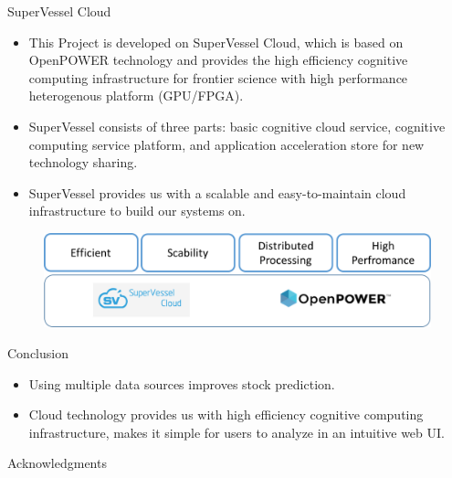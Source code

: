 \documentclass[final,hyperref={pdfpagelabels=false}]{beamer}
\begin{document}
\begin{frame}[t]
\begin{columns}[t]
\begin{column}{.445\textwidth}
\begin{block}{SuperVessel Cloud}
\begin{itemize}
\item This Project is developed on SuperVessel Cloud, which  is based on OpenPOWER technology and provides the high efficiency cognitive computing infrastructure for frontier science with high performance heterogenous platform (GPU/FPGA).
\item SuperVessel consists of three parts: basic cognitive cloud service, cognitive computing service platform, and application acceleration store for new technology sharing. 
\item SuperVessel provides us with a scalable and easy-to-maintain cloud infrastructure to build our systems on. 
\end{itemize}



 \begin{figure}
		\includegraphics[width=0.7\linewidth]{openpower.png}
	\end{figure}
\end{block}


\begin{block}{Conclusion}

\begin{itemize}
\item Using multiple data sources improves stock prediction. 
\item Cloud technology provides us with high efficiency cognitive computing infrastructure, makes it simple for users to analyze in an intuitive web UI.
\end{itemize}

\end{block}


\begin{block}{Acknowledgments}


\end{block}
\end{column}
\end{columns}
\end{frame}
\end{document}
